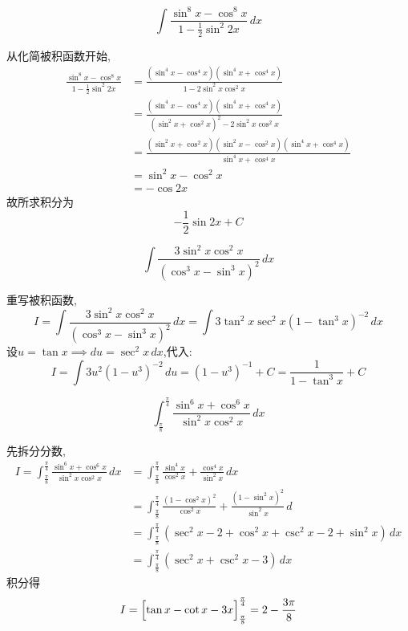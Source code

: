 \begin{questions}
    \question
    \[
    \int \frac{\sin^{8}x - \cos^{8}x}{1 - \frac{1}{2} \sin^{2} 2x} \, dx
    \]
    \begin{solution}
        从化简被积函数开始,
        \begin{align*}
        \frac{\sin^{8}x - \cos^{8}x}{1 - \frac{1}{2} \sin^{2} 2x} 
        &= \frac{(\sin^{4}x - \cos^{4}x)(\sin^{4}x + \cos^{4}x)}{1 - 2\sin^{2}x \cos^{2}x} \\
        &= \frac{(\sin^{4}x - \cos^{4}x)(\sin^{4}x + \cos^{4}x)}{(\sin^{2}x + \cos^{2}x)^2 - 2\sin^{2}x \cos^{2}x} \\
        &= \frac{(\sin^2 x + \cos^2 x)(\sin^2 x - \cos^2 x)(\sin^{4}x + \cos^{4}x)}{\sin^{4}x + \cos^{4}x} \\
        &= \sin^2 x - \cos^2 x \\
        &= -\cos 2x
        \end{align*}
        故所求积分为
        \[
        -\frac{1}{2} \sin 2x + C
        \]
    \end{solution}

    \question 
    \[
    \int \frac{3 \sin^2 x \cos^2 x}{(\cos^3 x - \sin^3 x)^2} \, dx
    \]
    \begin{solution}
        重写被积函数,
        \[
        I=\int \frac{3 \sin^2 x \cos^2 x}{(\cos^3 x - \sin^3 x)^2} \, dx 
        = \int 3 \tan^2 x \sec^2 x (1 - \tan^3 x)^{-2} \, dx
        \]
        设$u = \tan x \implies du = \sec^2 x \, dx$,代入:
        \[
        I= \int 3 u^2 (1 - u^3)^{-2} \, du = (1-u^3)^{-1} + C = \frac{1}{1 - \tan^3 x} + C
        \]
    \end{solution}

    \question 
    \[
    \int_{\frac{\pi}{8}}^{\frac{\pi}{4}} \frac{\sin^6 x + \cos^6 x}{\sin^2 x \cos^2 x} \, dx
    \]
    \begin{solution}
        先拆分分数,
        \begin{align*}
        I = \int_{\frac{\pi}{8}}^{\frac{\pi}{4}} \frac{\sin^6 x + \cos^6 x}{\sin^2 x \cos^2 x} \, dx
        &= \int_{\frac{\pi}{8}}^{\frac{\pi}{4}} \frac{\sin^4 x}{\cos^2 x} + \frac{\cos^4 x}{\sin^2 x} \, dx \\
        &= \int_{\frac{\pi}{8}}^{\frac{\pi}{4}} \frac{(1-\cos^2 x)^2}{\cos^2 x} + \frac{(1-\sin^2 x)^2}{\sin^2 x} \, d \\
        &= \int_{\frac{\pi}{8}}^{\frac{\pi}{4}} (\sec^2 x - 2 + \cos^2 x + \csc^2 x - 2 + \sin^2 x) \, dx \\
        &= \int_{\frac{\pi}{8}}^{\frac{\pi}{4}} (\sec^2 x + \csc^2 x - 3) \, dx
        \end{align*}
        积分得
        \[
        I = \Bigl[\tan x - \cot x - 3x\Bigr]_{\frac{\pi}{8}}^{\frac{\pi}{4}} = 2- \frac{3\pi}{8} 
        \]
    \end{solution}


\end{questions}
